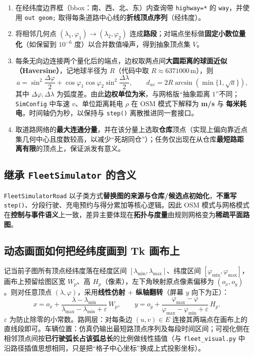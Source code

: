 \documentclass[UTF8,a4paper]{ctexart}
\begin{document}
\begin{enumerate}
  \item 在经纬度边界框（bbox：南、西、北、东）内查询带 \texttt{highway=*} 的 \texttt{way}，并使用 \texttt{out geom;} 取得每条道路中心线的\textbf{折线顶点序列}（经纬度）。
  \item 将相邻几何点 $(\lambda_1,\varphi_1)\rightarrow(\lambda_2,\varphi_2)$ 连成\textbf{路段}；对端点坐标做\textbf{固定小数位量化}（如保留到 $10^{-6}$ 度）以合并数值噪声，得到抽象顶点集 $V$。
  \item 每条无向边连接两个量化后的端点，边权取两点间\textbf{大圆距离的球面近似（Haversine）}，记地球半径为 $R$（代码中取 $R\approx 6371000\,\mathrm{m}$），则
  \begin{equation}
    a=\sin^2\frac{\Delta\varphi}{2}+\cos\varphi_1\cos\varphi_2\sin^2\frac{\Delta\lambda}{2},\qquad
    d_{uv}=2R\arcsin(\min\{1,\sqrt{a}\}),
  \end{equation}
  其中 $\Delta\varphi,\Delta\lambda$ 为弧度差。由此\textbf{边权单位为米}，与网格版“抽象距离 $1$”不同；\texttt{SimConfig} 中车速 $v$、单位距离耗电 $\rho$ 在 OSM 模式下解释为 \textbf{m/s} 与 \textbf{每米耗电}，时间轴仍为秒，以保持与 \texttt{step()} 离散推进同一套接口。
  \item 取道路网络的\textbf{最大连通分量}，并在该分量上选取\textbf{仓库}顶点（实现上偏向靠近点集几何中心且度数较高，以减少“死胡同仓”）；任务仅出现在从仓库\textbf{最短路距离有限}的顶点上，保证派发有意义。
\end{enumerate}

\subsection[继承 FleetSimulator]{继承 \texttt{FleetSimulator} 的含义}

\texttt{FleetSimulatorRoad} 以子类方式\textbf{替换图的来源与仓库/候选点初始化}，\textbf{不重写} \texttt{step()}、分段行驶、充电预约与得分累加等核心逻辑。因此 OSM 模式与网格模式在\textbf{控制与事件语义}上一致，差异主要体现在\textbf{拓扑与度量}由规则网格变为\textbf{稀疏平面路图}。

\subsection{动态画面如何把经纬度画到 Tk 画布上}

记当前子图所有顶点经纬度落在经度区间 $[\lambda_{\min},\lambda_{\max}]$、纬度区间 $[\varphi_{\min},\varphi_{\max}]$，画布上预留绘图区宽 $W_p$、高 $H_p$（像素），左下角映射原点像素偏移为 $(o_x,o_y)$。则对任意顶点 $(\lambda,\varphi)$，采用\textbf{线性仿射 $+$ 纵轴翻转}（屏幕 $y$ 向下为正）：
\begin{equation}
  x = o_x + \frac{\lambda-\lambda_{\min}}{\lambda_{\max}-\lambda_{\min}+\varepsilon}\,W_p,\qquad
  y = o_y + \frac{\varphi_{\max}-\varphi}{\varphi_{\max}-\varphi_{\min}+\varepsilon}\,H_p.
\end{equation}
$\varepsilon$ 为防止除零的小常数。路网层：对每条边 $(u,v)\in E$ 连接其两端点在画布上的直线段即可。车辆位置：仿真仍输出最短路顶点序列及每段时间区间；可视化侧在相邻顶点间按\textbf{已行驶弧长占该弧总长}的比例做线性插值（与 \texttt{fleet\_visual.py} 中沿路径插值思想相同，只是把“格子中心坐标”换成上式投影坐标）。
\end{document}
